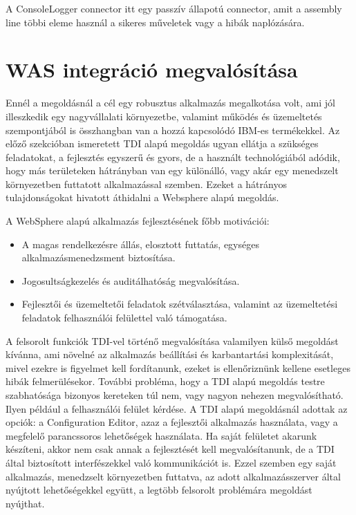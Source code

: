 A ConsoleLogger connector itt egy passzív állapotú connector, amit a assembly line többi eleme használ a sikeres műveletek vagy a hibák naplózására.

\section{WAS integráció megvalósítása}

Ennél a megoldásnál a cél egy robusztus alkalmazás megalkotása volt, ami jól illeszkedik egy nagyvállalati környezetbe, valamint működés és üzemeltetés szempontjából is összhangban van a hozzá kapcsolódó IBM-es termékekkel. Az előző szekcióban ismeretett TDI alapú megoldás ugyan ellátja a szükséges feladatokat, a fejlesztés egyszerű és gyors, de a használt technológiából adódik, hogy más területeken hátrányban van egy különálló, vagy akár egy menedszelt környezetben futtatott alkalmazással szemben. Ezeket a hátrányos tulajdonságokat hivatott áthidalni a Websphere alapú megoldás.

A WebSphere alapú alkalmazás fejlesztésének főbb motivációi:
\begin{itemize}	
	\item A magas rendelkezésre állás, elosztott futtatás, egységes alkalmazásmenedzsment biztosítása.	
	
	\item Jogosultságkezelés és auditálhatóság megvalósítása. 
	
	\item Fejlesztői és üzemeltetői feladatok szétválasztása, valamint az üzemeltetési feladatok felhasználói felülettel való támogatása.
\end{itemize}

A felsorolt funkciók TDI-vel történő megvalósítása valamilyen külső megoldást kívánna, ami növelné az alkalmazás beállítási és karbantartási komplexitását, mivel ezekre is figyelmet kell fordítanunk, ezeket is ellenőriznünk kellene esetleges hibák felmerülésekor. További probléma, hogy a TDI alapú megoldás testre szabhatósága bizonyos kereteken túl nem, vagy nagyon nehezen megvalósítható. Ilyen például a felhasználói felület kérdése. A TDI alapú megoldásnál adottak az opciók: a Configuration Editor, azaz a fejlesztői alkalmazás használata, vagy a megfelelő parancssoros lehetőségek használata. Ha saját felületet akarunk készíteni, akkor nem csak annak a fejlesztését kell megvalósítanunk, de a TDI által biztosított interfészekkel való kommunikációt is. Ezzel szemben egy saját alkalmazás, menedzselt környezetben futtatva, az adott alkalmazásszerver által nyújtott lehetőségekkel együtt, a legtöbb felsorolt problémára megoldást nyújthat. 

